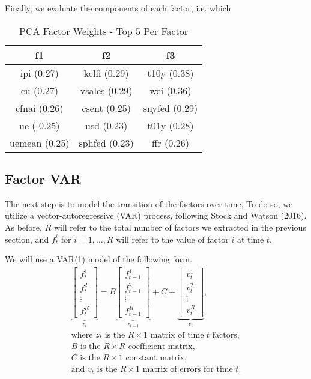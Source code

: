\documentclass[11pt, letterpaper]{article}\usepackage[]{graphicx}\usepackage[]{color}
\begin{document}
Finally, we evaluate the components of each factor, i.e. which 
\begin{table}[H]
\centering
\begingroup\scriptsize
\begin{tabular}{ccc}
  \hline
f1 & f2 & f3 \\ 
  \hline
ipi (0.27) & kclfi (0.29) & t10y (0.38) \\ 
  cu (0.27) & vsales (0.29) & wei (0.36) \\ 
  cfnai (0.26) & csent (0.25) & snyfed (0.29) \\ 
  ue (-0.25) & usd (0.23) & t01y (0.28) \\ 
  uemean (0.25) & sphfed (0.23) & ffr (0.26) \\ 
   \hline
\end{tabular}
\endgroup
\caption{PCA Factor Weights - Top 5 Per Factor} 
\end{table}




\subsection{Factor VAR}
The next step is to model the transition of the factors over time. To do so, we utilize a vector-autoregressive (VAR) process, following Stock and Watson (2016). As before, $R$ will refer to the total number of factors we extracted in the previous section, and $f^i_t$ for $i = 1, \dots, R$ will refer to the value of factor $i$ at time $t$.

We will use a VAR(1) model of the following form.
\begin{align*}
\underbrace{\begin{bmatrix}
	f^1_{t}\\
	f^2_{t}\\
	\vdots \\
	f^R_{t}
\end{bmatrix}}_{z_t}
=
B
\underbrace{\begin{bmatrix}
	f^1_{t-1}\\
	f^2_{t-1}\\
	\vdots \\
	f^R_{t-1}
\end{bmatrix}}_{z_{t-1}}
+
C
+
\underbrace{\begin{bmatrix}
v^1_t\\
v^2_t\\
\vdots\\
v^R_t
\end{bmatrix}}_{v_t},\\
\text{where $z_t$ is the $R \times 1$ matrix of time $t$ factors,}\\
\text{$B$ is the $R \times R$ coefficient matrix,}\\
\text{$C$ is the $R \times 1$ constant matrix,}\\
\text{and $v_t$ is the $R \times 1$ matrix of errors for time $t$.}
\end{align*}
\end{document}
